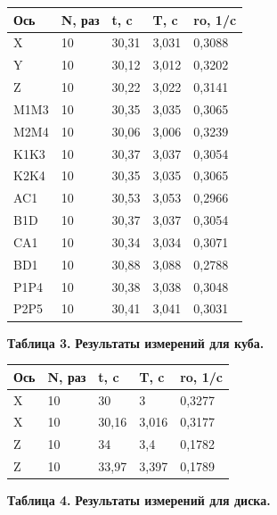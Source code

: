 \begin{table}[H]
\centering
\begin{tabular}{|l|l|l|l|l|}
\hline
Ось  & N, раз & t, c  & T, c  & ro, 1/c \\ \hline
X    & 10     & 30,31 & 3,031 & 0,3088  \\ \hline
Y    & 10     & 30,12 & 3,012 & 0,3202  \\ \hline
Z    & 10     & 30,22 & 3,022 & 0,3141  \\ \hline
M1M3 & 10     & 30,35 & 3,035 & 0,3065  \\ \hline
M2M4 & 10     & 30,06 & 3,006 & 0,3239  \\ \hline
K1K3 & 10     & 30,37 & 3,037 & 0,3054  \\ \hline
K2K4 & 10     & 30,35 & 3,035 & 0,3065  \\ \hline
AC1  & 10     & 30,53 & 3,053 & 0,2966  \\ \hline
B1D  & 10     & 30,37 & 3,037 & 0,3054  \\ \hline
CA1  & 10     & 30,34 & 3,034 & 0,3071  \\ \hline
BD1  & 10     & 30,88 & 3,088 & 0,2788  \\ \hline
P1P4 & 10     & 30,38 & 3,038 & 0,3048  \\ \hline
P2P5 & 10     & 30,41 & 3,041 & 0,3031  \\ \hline
\end{tabular}
\begin{flushright}
{\scriptsize \textbf{Таблица 3.} \textbf {Результаты измерений для куба.}}
\end{flushright}    
\end{table}

\begin{table}[H]
\centering
\begin{tabular}{|l|l|l|l|l|}
\hline
Ось & N, раз & t, c  & T, c  & ro, 1/c \\ \hline
X   & 10     & 30    & 3     & 0,3277  \\ \hline
X   & 10     & 30,16 & 3,016 & 0,3177  \\ \hline
Z   & 10     & 34    & 3,4   & 0,1782  \\ \hline
Z   & 10     & 33,97 & 3,397 & 0,1789  \\ \hline
\end{tabular}
\begin{flushright}
{\scriptsize \textbf{Таблица 4.} \textbf {Результаты измерений для диска.}}
\end{flushright}
\end{table}

